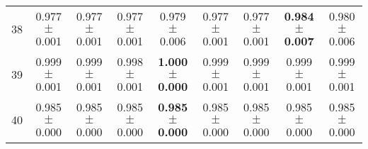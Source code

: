 \begin{table}[!ht]
{\begin{tabular}{r c c c c c c c c}
38 & 0.977 $\pm$ 0.001 & 0.977 $\pm$ 0.001 & 0.977 $\pm$ 0.001 & 0.979 $\pm$ 0.006 & 0.977 $\pm$ 0.001 & 0.977 $\pm$ 0.001 & \textbf{0.984 $\pm$ 0.007} & 0.980 $\pm$ 0.006 \\
39 & 0.999 $\pm$ 0.001 & 0.999 $\pm$ 0.001 & 0.998 $\pm$ 0.001 & \textbf{1.000 $\pm$ 0.000} & 0.999 $\pm$ 0.001 & 0.999 $\pm$ 0.001 & 0.999 $\pm$ 0.001 & 0.999 $\pm$ 0.001 \\
40 & 0.985 $\pm$ 0.000 & 0.985 $\pm$ 0.000 & 0.985 $\pm$ 0.000 & \textbf{0.985 $\pm$ 0.000} & 0.985 $\pm$ 0.000 & 0.985 $\pm$ 0.000 & 0.985 $\pm$ 0.000 & 0.985 $\pm$ 0.000 \\
\end{tabular}}
\end{table}
